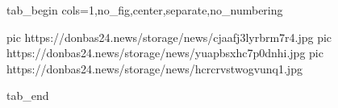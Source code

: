  
 
 
 
 

\ifcmt
  tab_begin cols=1,no_fig,center,separate,no_numbering

     pic https://donbas24.news/storage/news/cjaafj3lyrbrm7r4.jpg
		 pic https://donbas24.news/storage/news/yuapbsxhc7p0dnhi.jpg
		 pic https://donbas24.news/storage/news/hcrcrvstwogvunq1.jpg

  tab_end
\fi
